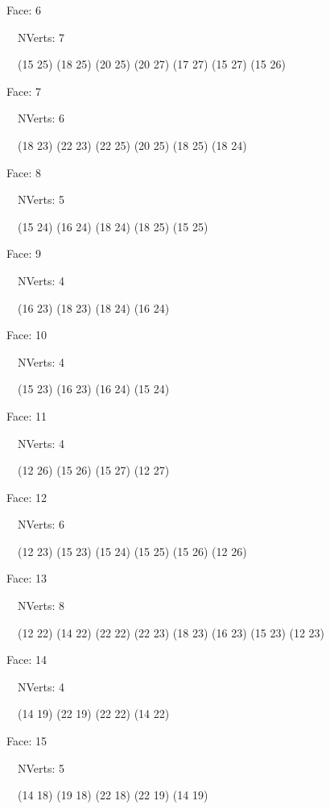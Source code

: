 \documentclass{article}
\begin{document}
{\footnotesize 

Face: 6

\   \    NVerts: 7

 \   \   (15 25) (18 25) (20 25) (20 27) (17 27) (15 27) (15 26)}

{\footnotesize 

Face: 7

\   \    NVerts: 6

 \   \   (18 23) (22 23) (22 25) (20 25) (18 25) (18 24)}

{\footnotesize 

Face: 8

\   \    NVerts: 5

 \   \   (15 24) (16 24) (18 24) (18 25) (15 25)}

{\footnotesize 

Face: 9

\   \    NVerts: 4

 \   \   (16 23) (18 23) (18 24) (16 24)}

{\footnotesize 

Face: 10

\   \    NVerts: 4

 \   \   (15 23) (16 23) (16 24) (15 24)}

{\footnotesize 

Face: 11

\   \    NVerts: 4

 \   \   (12 26) (15 26) (15 27) (12 27)}

{\footnotesize 

Face: 12

\   \    NVerts: 6

 \   \   (12 23) (15 23) (15 24) (15 25) (15 26) (12 26)}

{\footnotesize 

Face: 13

\   \    NVerts: 8

 \   \   (12 22) (14 22) (22 22) (22 23) (18 23) (16 23) (15 23) (12 23)}

{\footnotesize 

Face: 14

\   \    NVerts: 4

 \   \   (14 19) (22 19) (22 22) (14 22)}

{\footnotesize 

Face: 15

\   \    NVerts: 5

 \   \   (14 18) (19 18) (22 18) (22 19) (14 19)}
\end{document}
